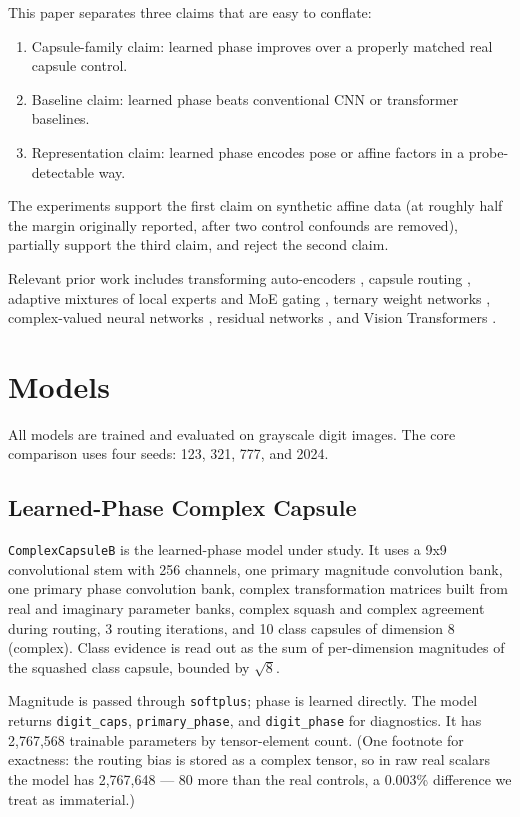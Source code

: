 \documentclass[11pt]{article}
\begin{document}
This paper separates three claims that are easy to conflate:
\begin{enumerate}
  \item Capsule-family claim: learned phase improves over a properly matched real capsule control.
  \item Baseline claim: learned phase beats conventional CNN or transformer baselines.
  \item Representation claim: learned phase encodes pose or affine factors in a probe-detectable way.
\end{enumerate}

The experiments support the first claim on synthetic affine data (at roughly half the margin originally reported, after two control confounds are removed), partially support the third claim, and reject the second claim.

Relevant prior work includes transforming auto-encoders \citep{hinton2011transforming}, capsule routing \citep{sabour2017dynamic,hinton2018matrix}, adaptive mixtures of local experts and MoE gating \citep{jacobs1991adaptive,shazeer2017outrageously}, ternary weight networks \citep{li2016ternary}, complex-valued neural networks \citep{trabelsi2018deepcomplex}, residual networks \citep{he2016deepresidual}, and Vision Transformers \citep{dosovitskiy2021image}.

\section{Models}
\label{sec:models}
All models are trained and evaluated on grayscale digit images. The core comparison uses four seeds: 123, 321, 777, and 2024.

\subsection{Learned-Phase Complex Capsule}
\texttt{ComplexCapsuleB} is the learned-phase model under study. It uses a 9x9 convolutional stem with 256 channels, one primary magnitude convolution bank, one primary phase convolution bank, complex transformation matrices built from real and imaginary parameter banks, complex squash and complex agreement during routing, 3 routing iterations, and 10 class capsules of dimension 8 (complex). Class evidence is read out as the sum of per-dimension magnitudes of the squashed class capsule, bounded by $\sqrt{8}$.

Magnitude is passed through \texttt{softplus}; phase is learned directly. The model returns \texttt{digit\_caps}, \texttt{primary\_phase}, and \texttt{digit\_phase} for diagnostics. It has 2{,}767{,}568 trainable parameters by tensor-element count. (One footnote for exactness: the routing bias is stored as a complex tensor, so in raw real scalars the model has 2{,}767{,}648 --- 80 more than the real controls, a 0.003\% difference we treat as immaterial.)
\end{document}
